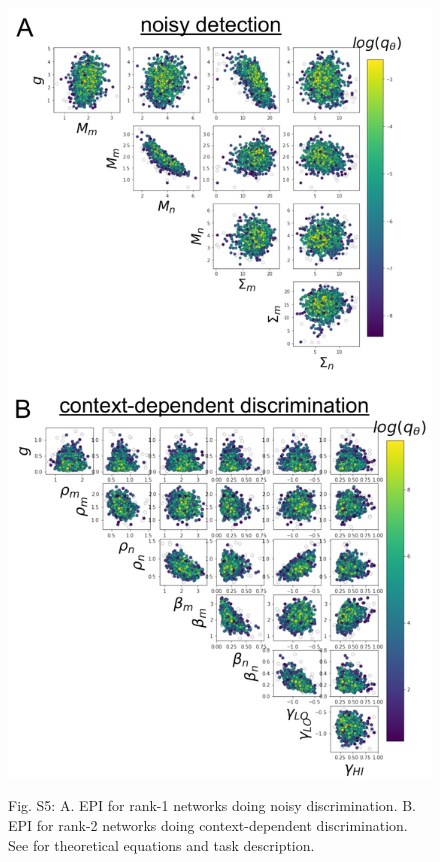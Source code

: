 \documentclass[11pt]{article}
\begin{document}
\begin{figure}
\begin{center}
\includegraphics[scale=0.5]{figures/figS1/figS1.pdf}
\end{center}
Fig. S5: A. EPI for rank-1 networks doing noisy discrimination. B. EPI for rank-2 networks doing context-dependent discrimination.  See \cite{mastrogiuseppe2018linking} for theoretical equations and task description.
\end{figure}
\end{document}
